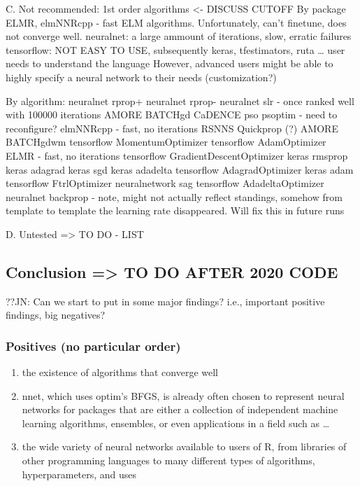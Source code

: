 C. Not recommended: 1st order algorithms \textless- DISCUSS CUTOFF By
package ELMR, elmNNRcpp - fast ELM algorithms. Unfortunately, can't
finetune, does not converge well. neuralnet: a large ammount of
iterations, slow, erratic failures tensorflow: NOT EASY TO USE,
subsequently keras, tfestimators, ruta \ldots{} user needs to understand
the language However, advanced users might be able to highly specify a
neural network to their needs (customization?)

By algorithm: neuralnet rprop+ neuralnet rprop- neuralnet slr - once
ranked well with 100000 iterations AMORE BATCHgd CaDENCE pso psoptim -
need to reconfigure? elmNNRcpp - fast, no iterations RSNNS Quickprop (?)
AMORE BATCHgdwm tensorflow MomentumOptimizer tensorflow AdamOptimizer
ELMR - fast, no iterations tensorflow GradientDescentOptimizer keras
rmsprop keras adagrad keras sgd keras adadelta tensorflow
AdagradOptimizer keras adam tensorflow FtrlOptimizer neuralnetwork sag
tensorflow AdadeltaOptimizer neuralnet backprop - note, might not
actually reflect standings, somehow from template to template the
learning rate disappeared. Will fix this in future runs

D. Untested =\textgreater{} TO DO - LIST

\hypertarget{conclusion-to-do-after-2020-code}{%
\subsection{Conclusion =\textgreater{} TO DO AFTER 2020
CODE}\label{conclusion-to-do-after-2020-code}}

??JN: Can we start to put in some major findings? i.e., important
positive findings, big negatives?

\hypertarget{positives-no-particular-order}{%
\subsubsection{Positives (no particular
order)}\label{positives-no-particular-order}}

\begin{enumerate}
\def\labelenumi{\arabic{enumi}.}
\tightlist
\item
  the existence of algorithms that converge well
\item
  nnet, which uses optim's BFGS, is already often chosen to represent
  neural networks for packages that are either a collection of
  independent machine learning algorithms, ensembles, or even
  applications in a field such as \ldots{}
\item
  the wide variety of neural networks available to users of R, from
  libraries of other programming languages to many different types of
  algorithms, hyperparameters, and uses
\end{enumerate}

